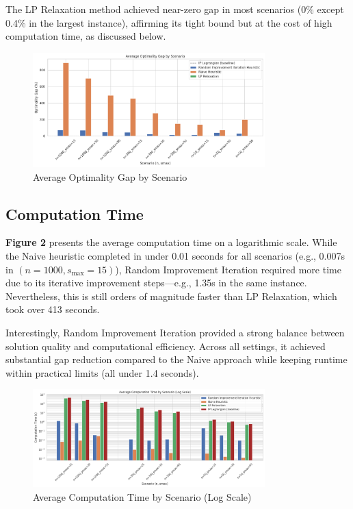 The LP Relaxation method achieved near-zero gap in most scenarios (0\% except 0.4\% in the largest instance), affirming its tight bound but at the cost of high computation time, as discussed below.

\begin{figure}[H]
    \centering
    \includegraphics[width=0.8\textwidth]{assets/gap.png}
    \caption{Average Optimality Gap by Scenario}
    \label{fig:your-label}
\end{figure}

\subsection{Computation Time}

\textbf{Figure 2} presents the average computation time on a logarithmic scale. While the Naive heuristic completed in under 0.01 seconds for all scenarios (e.g., 0.007s in $(n=1000, s_{\max}=15)$), Random Improvement Iteration required more time due to its iterative improvement steps—e.g., 1.35s in the same instance. Nevertheless, this is still orders of magnitude faster than LP Relaxation, which took over 413 seconds.

Interestingly, Random Improvement Iteration provided a strong balance between solution quality and computational efficiency. Across all settings, it achieved substantial gap reduction compared to the Naive approach while keeping runtime within practical limits (all under 1.4 seconds). 

\begin{figure}[H]
    \centering
    \includegraphics[width=0.8\textwidth]{assets/time.png}
    \caption{Average Computation Time by Scenario (Log Scale)}
    \label{fig:your-label}
\end{figure}


